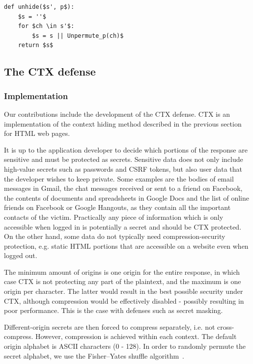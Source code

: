 \documentclass[conference, letterpaper, 10pt]{IEEEtran}
\begin{document}
\begin{lstlisting}[texcl,mathescape,basicstyle=\small]
def unhide($s', p$):
    $s = ''$
    for $ch \in s'$:
        $s = s || Unpermute_p(ch)$
    return $s$
\end{lstlisting}

\subsection{The CTX defense}\label{subsec:ctx}

\subsubsection{Implementation}
Our contributions include the development of the CTX defense. CTX is an
implementation of the context hiding method described in the previous section
for HTML web pages.

It is up to the application developer to decide which portions of the response
are sensitive and must be protected as secrets. Sensitive data does not only
include high-value secrets such as passwords and CSRF tokens, but also user data
that the developer wishes to keep private. Some examples are the bodies of email
messages in Gmail, the chat messages received or sent to a friend on Facebook,
the contents of documents and spreadsheets in Google Docs and the list of online
friends on Facebook or Google Hangouts, as they contain all the important
contacts of the victim. Practically any piece of information which is only
accessible when logged in is potentially a secret and should be CTX protected.
On the other hand, some data do not typically need compression-security
protection, e.g. static HTML portions that are accessible on a website even when
logged out.

The minimum amount of origins is one origin for the entire response, in which
case CTX is not protecting any part of the plaintext, and the maximum is one
origin per character. The latter would result in the best possible security
under CTX, although compression would be effectively disabled - possibly resulting
in poor performance. This is the case with defenses such as secret masking.

Different-origin secrets are then forced to compress separately, i.e. not
cross-compress. However, compression is achieved within each context. The
default origin alphabet is ASCII characters (0 - 128). In order to randomly
permute the secret alphabet, we use the Fisher--Yates shuffle
algorithm~\cite{c17}.
\end{document}
